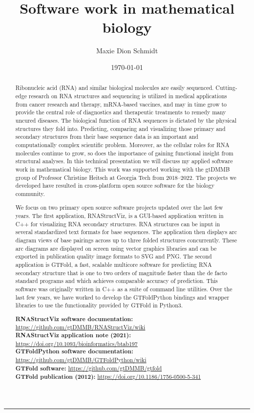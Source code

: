 \documentclass[reqno,11pt]{article}
\title{Software work in mathematical biology}
\author{Maxie Dion Schmidt}
\date{\today}
\theoremstyle{remark}
\begin{document}
\maketitle 
\medskip\hrule\medskip 

\begin{abstract}
\noindent
Ribonucleic acid (RNA) and similar biological molecules are easily sequenced. 
Cutting-edge research on RNA structures and sequencing is utilized in medical 
applications from cancer research and therapy, mRNA-based vaccines, and may in time 
grow to provide the central role of diagnostics and therapeutic treatments to 
remedy many uncured diseases. 
The biological function of RNA sequences is dictated by the physical structures they fold into. 
Predicting, comparing and visualizing those primary and secondary structures from their 
base sequence data is an important and computationally complex scientific problem. 
Moreover, as the cellular roles for RNA molecules continue to grow, 
so does the importance of gaining functional insight from structural analyses. 
In this technical presentation we will discuss my applied software 
work in mathematical biology. 
This work was supported working with the gtDMMB group of Professor Christine Heitsch 
at Georgia Tech from 2018--2022. 
The projects we developed have resulted in cross-platform open source software for the 
biology community. 

We focus on two primary open source software projects updated over the last few years. 
The first application, RNAStructViz, 
is a GUI-based application written in C++ for visualizing RNA secondary structures. 
RNA structures can be input in several standardized text formats for base sequences. 
The application then displays arc diagram views of base pairings across up to three 
folded structures concurrently. 
These arc diagrams are displayed on screen using vector graphics libraries and can be exported 
in publication quality image formats to SVG and PNG. 
The second application is GTFold, a fast, scalable multicore software for predicting RNA secondary structure that 
is one to two orders of magnitude faster than the de facto standard programs 
and which achieves comparable accuracy of prediction. 
This software was originally written in C++ as a suite of command line utilities. 
Over the last few years, we have worked to develop the GTFoldPython bindings and wrapper libraries 
to use the functionality provided by GTFold in Python3. 

\smallskip\smallskip
\noindent
\textbf{RNAStructViz software documentation:} \url{https://github.com/gtDMMB/RNAStructViz/wiki} \\ 
\textbf{RNAStructViz application note (2021):} \url{https://doi.org/10.1093/bioinformatics/btab197} \\ 
\textbf{GTFoldPython software documentation:} \url{https://github.com/gtDMMB/GTFoldPython/wiki} \\ 
\textbf{GTFold software:} \url{https://github.com/gtDMMB/gtfold} \\ 
\textbf{GTFold publication (2012):} \url{https://doi.org/10.1186/1756-0500-5-341} \\ 

\end{abstract}
\end{document}
